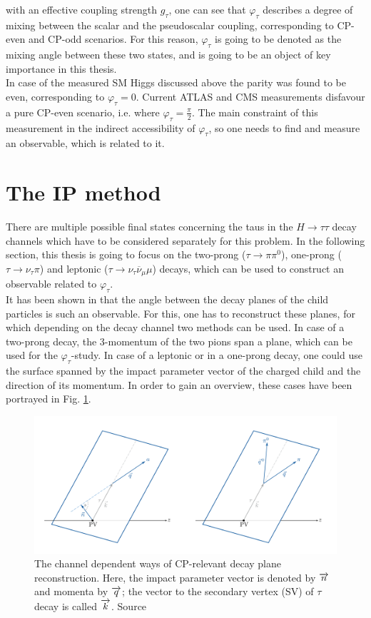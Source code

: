 with an effective coupling strength $g_\tau$, one can see that $\varphi_\tau$ describes a degree of mixing between the scalar and the pseudoscalar coupling, corresponding to CP-even and CP-odd scenarios. For this reason, $\varphi_\tau$ is going to be denoted as the mixing angle between these two states, and is going to be an object of key importance in this thesis.\\
In case of the measured SM Higgs discussed above the parity was found to be even, corresponding to $\varphi_\tau = 0$. Current ATLAS and CMS measurements \parencite{CMS_CP_odd_exclusion,ATLAS_CP_odd_exclusion} disfavour a pure CP-even scenario, i.e. where $\varphi_\tau = \frac{\pi}{2}$. The main constraint of this measurement in the indirect accessibility of $\varphi_\tau$, so one needs to find and measure an observable, which is related to it.
\section{The IP method}
\label{sec:IP_method}
There are multiple possible final states concerning the taus in the $H\rightarrow\tau\tau$ decay channels which have to be considered separately for this problem. In the following section, this thesis is going to focus on the two-prong ($\tau \rightarrow \pi\pi^0$), one-prong ($\tau \rightarrow \nu_\tau\pi$) and leptonic ($\tau \rightarrow \nu_\tau\overline{\nu}_\mu \mu$) decays, which can be used to construct an observable related to $\varphi_\tau$.\\
It has been shown in \parencite{Berge_1prong, Berge_CP_Prospects} that the angle between the decay planes of the child particles is such an observable. For this, one has to reconstruct these planes, for which depending on the decay channel two methods can be used. In case of a two-prong decay, the 3-momentum of the two pions span a plane, which can be used for the $\varphi_\tau$-study. In case of a leptonic or in a one-prong decay, one could use the surface spanned by the impact parameter vector of the charged child and the direction of its momentum. In order to gain an overview, these cases have been portrayed in Fig. \ref{fig:claudiadecayplanes}.
\begin{figure}[h]
	\centering
	\includegraphics[width=0.7\linewidth]{Figures/Claudia_decay_planes}
	\caption{The channel dependent ways of CP-relevant decay plane reconstruction. Here, the impact parameter vector is denoted by $\protect\overrightarrow{n}$ and momenta by $\protect\overrightarrow{q}$; the vector to the secondary vertex (SV) of $\tau$ decay is called $\protect\overrightarrow{k}$. Source \parencite{Claudia_thesis}}
	\label{fig:claudiadecayplanes}
\end{figure}\\
